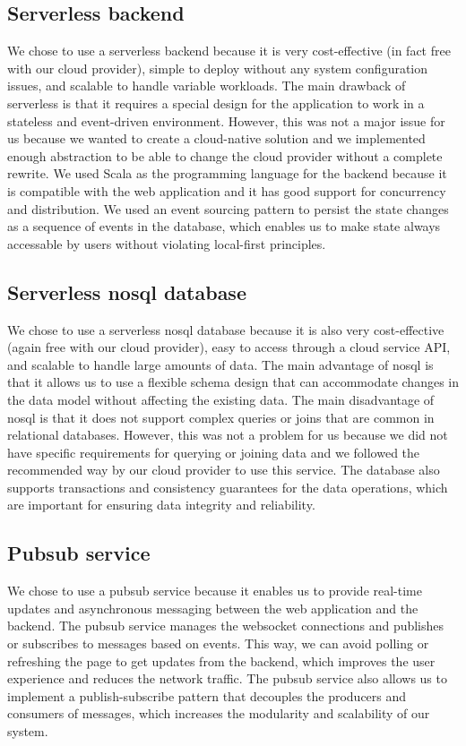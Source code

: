 \documentclass[
	ngerman,
	ruledheaders=section,   %
	class=report,		    %
	thesis={type=bachelor}, %
	accentcolor=9c,			%
	custommargins=true,    %
	marginpar=false,        %
	parskip=half-,          %
	fontsize=11pt,          %
]{tudapub}
\begin{document}
\subsection{Serverless backend} 
We chose to use a serverless backend because it is very cost-effective (in fact free with our cloud provider), simple to deploy without any system configuration issues, and scalable to handle variable workloads. The main drawback of serverless is that it requires a special design for the application to work in a stateless and event-driven environment. However, this was not a major issue for us because we wanted to create a cloud-native solution and we implemented enough abstraction to be able to change the cloud provider without a complete rewrite. We used Scala as the programming language for the backend because it is compatible with the web application and it has good support for concurrency and distribution. We used an event sourcing pattern to persist the state changes as a sequence of events in the database, which enables us to make state always accessable by users without violating local-first principles.

\subsection{Serverless nosql database} 
We chose to use a serverless nosql database because it is also very cost-effective (again free with our cloud provider), easy to access through a cloud service API, and scalable to handle large amounts of data. The main advantage of nosql is that it allows us to use a flexible schema design that can accommodate changes in the data model without affecting the existing data. The main disadvantage of nosql is that it does not support complex queries or joins that are common in relational databases. However, this was not a problem for us because we did not have specific requirements for querying or joining data and we followed the recommended way by our cloud provider to use this service. The database also supports transactions and consistency guarantees for the data operations, which are important for ensuring data integrity and reliability.

\subsection{Pubsub service}
We chose to use a pubsub service because it enables us to provide real-time updates and asynchronous messaging between the web application and the backend. The pubsub service manages the websocket connections and publishes or subscribes to messages based on events. This way, we can avoid polling or refreshing the page to get updates from the backend, which improves the user experience and reduces the network traffic. The pubsub service also allows us to implement a publish-subscribe pattern that decouples the producers and consumers of messages, which increases the modularity and scalability of our system.
\end{document}
